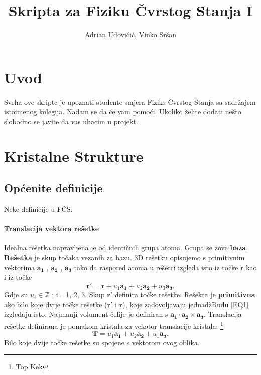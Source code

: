 \documentclass{article}
\title{Skripta za Fiziku Čvrstog Stanja I}
\author{Adrian Udovičić, Vinko Sršan}
\numberwithin{equation}{section}
\begin{document}
\maketitle
{}
\section*{\centering Uvod}

Svrha ove skripte je upoznati studente smjera Fizike Čvrstog Stanja sa sadržajem istoimenog kolegija. Nadam se da će vam pomoći. Ukoliko želite dodati nešto slobodno se javite da vas ubacim u projekt.

\vfill

\begin{center}
\tableofcontents
\end{center}
\vfill
\newpage
\section{Kristalne Strukture}
\subsection{Općenite definicije}
Neke definicije u FČS.
\paragraph{Translacija vektora rešetke}
Idealna rešetka napravljena je od identičnih grupa atoma. Grupa se zove \textbf{baza}. \textbf{Rešetka} je skup točaka vezanih za bazu. 3D rešetku opisujemo s primitivnim vektorima $\mathbf{a_1}$ , $\mathbf{a_2}$ , $\mathbf{a_3}$  tako da raspored atoma u rešetci izgleda isto iz točke \textbf{r} kao i iz točke  
\begin{equation}
    \mathbf{r'} =  \mathbf{r} + u_1 \mathbf{a_1} + u_2 \mathbf{a_2} + u_3 \mathbf{a_3}.
    \label{EQ1}
\end{equation}
Gdje su $u_i \in \mathbb{Z}$ ; i= 1, 2, 3. Skup $\mathbf{r'}$ definira točke rešetke. 
Rešekta je \textbf{primitivna} ako bilo koje dvije točke rešetke ($\mathbf{r'}$ i $\mathbf{r}$), koje zadovoljavaju jednadžBudu 
\ref{EQ1} izgledaju isto. Najmanji volument čelije je definiran s $\mathbf{a_1} \cdot \mathbf{a_2} \times \mathbf{a_3}$. 
Translacija rešetke definirana je pomakom kristala za vekotor translacije kristala. \footnote{Top Kek} 
\begin{equation}
    \mathbf{T}=u_1\mathbf{a_1}+u_2\mathbf{a_2}+u_1\mathbf{a_3}.
    \label{EQ2}
\end{equation}
Bilo  koje dvije točke rešetke su spojene s vektorom ovog oblika. 
\end{document}
